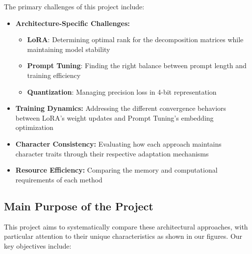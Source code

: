 \documentclass{article}
\begin{document}
The primary challenges of this project include:
\begin{itemize}
    \item \textbf{Architecture-Specific Challenges:}
    \begin{itemize}
        \item \textbf{LoRA}: Determining optimal rank for the decomposition matrices while maintaining model stability
        \item \textbf{Prompt Tuning}: Finding the right balance between prompt length and training efficiency
        \item \textbf{Quantization}: Managing precision loss in 4-bit representation
    \end{itemize}
    \item \textbf{Training Dynamics:} Addressing the different convergence behaviors between LoRA's weight updates and Prompt Tuning's embedding optimization
    \item \textbf{Character Consistency:} Evaluating how each approach maintains character traits through their respective adaptation mechanisms
    \item \textbf{Resource Efficiency:} Comparing the memory and computational requirements of each method
\end{itemize}

\subsection{Main Purpose of the Project}
This project aims to systematically compare these architectural approaches, with particular attention to their unique characteristics as shown in our figures. Our key objectives include:
\end{document}
